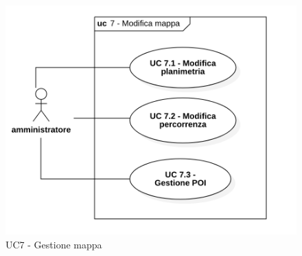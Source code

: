\begin{figure}[H]

   \centering

   \includegraphics[scale=0.52]{res/images/uc7.png}

  \caption{UC7 - Gestione mappa}

\end{figure}



